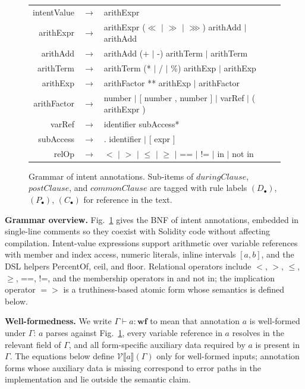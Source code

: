 \documentclass[pdflatex,sn-basic]{sn-jnl}%
\theoremstyle{thmstyleone}%
\theoremstyle{thmstyletwo}%
\theoremstyle{thmstylethree}%
\begin{document}
\begin{figure}[t]
\begin{tabular}{@{}r@{\quad}c@{\quad}l@{\qquad}l@{}}
intentValue & $\rightarrow$ & arithExpr & \\[2pt]
arithExpr   & $\rightarrow$ & arithExpr ($\ll$ $|$ $\gg$ $|$ $\ggg$) arithAdd $|$ arithAdd & \\
arithAdd    & $\rightarrow$ & arithAdd (+ $|$ -) arithTerm $|$ arithTerm & \\
arithTerm   & $\rightarrow$ & arithTerm (* $|$ / $|$ \%) arithExp $|$ arithExp & \\
arithExp    & $\rightarrow$ & arithFactor ** arithExp $|$ arithFactor & \\
arithFactor & $\rightarrow$ & number $|$ [ number , number ] $|$ varRef $|$ ( arithExpr ) & \\[2pt]
varRef      & $\rightarrow$ & identifier subAccess* & \\
subAccess   & $\rightarrow$ & . identifier $|$ [ expr ] & \\[6pt]

relOp & $\rightarrow$ & $<$ $|$ $>$ $|$ $\leq$ $|$ $\geq$ $|$ == $|$ != $|$ in $|$ not in & \\
\end{tabular}
\caption{Grammar of intent annotations. Sub-items of $\mathit{duringClause}$, $\mathit{postClause}$, and $\mathit{commonClause}$ are tagged with rule labels $(D_\bullet)$, $(P_\bullet)$, $(C_\bullet)$ for reference in the text.}
\label{fig:intent-grammar}
\end{figure}

\smallskip
\noindent\textbf{Grammar overview.}
Fig.~\ref{fig:intent-grammar} gives the BNF of intent annotations, embedded in single-line comments so they coexist with Solidity code without affecting compilation.
Intent-value expressions support arithmetic over variable references with member and index access, numeric literals, inline intervals $[a, b]$, and the DSL helpers PercentOf, ceil, and floor.
Relational operators include $<$, $>$, $\leq$, $\geq$, ==, !=, and the membership operators in and not in; the implication operator ${=}{>}$ is a truthiness-based atomic form whose semantics is defined below.

\smallskip
\noindent\textbf{Well-formedness.}
We write $\Gamma \vdash a : \mathbf{wf}$ to mean that annotation $a$ is well-formed under $\Gamma$: $a$ parses against Fig.~\ref{fig:intent-grammar}, every variable reference in $a$ resolves in the relevant field of $\Gamma$, and all form-specific auxiliary data required by $a$ is present in $\Gamma$.
The equations below define $\mathcal{V}\llbracket a \rrbracket(\Gamma)$ only for well-formed inputs; annotation forms whose auxiliary data is missing correspond to error paths in the implementation and lie outside the semantic claim.
\end{document}
